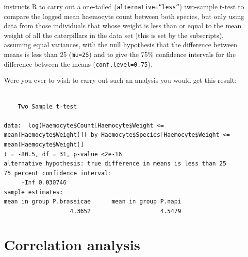 \documentclass[
]{book}
\newenvironment{Shaded}{\begin{snugshade}}{\end{snugshade}}
\newcommand{\DataTypeTok}[1]{\textcolor[rgb]{0.13,0.29,0.53}{#1}}
\newcommand{\DecValTok}[1]{\textcolor[rgb]{0.00,0.00,0.81}{#1}}
\newcommand{\FloatTok}[1]{\textcolor[rgb]{0.00,0.00,0.81}{#1}}
\newcommand{\KeywordTok}[1]{\textcolor[rgb]{0.13,0.29,0.53}{\textbf{#1}}}
\newcommand{\NormalTok}[1]{#1}
\newcommand{\OperatorTok}[1]{\textcolor[rgb]{0.81,0.36,0.00}{\textbf{#1}}}
\newcommand{\StringTok}[1]{\textcolor[rgb]{0.31,0.60,0.02}{#1}}
\begin{document}
\begin{Shaded}
\end{Shaded}

instructs R to carry out a one-tailed (\texttt{alternative=”less”}) two-sample t-test to compare the logged mean haemocyte count between both species, but only using data from those individuals that whose weight is less than or equal to the mean weight of all the caterpillars in the data set (this is set by the subscripts), assuming equal variances, with the null hypothesis that the difference between means is less than 25 (\texttt{mu=25}) and to give the 75\% confidence intervals for the difference between the means (\texttt{conf.level=0.75}).

Were you ever to wish to carry out such an analysis you would get this result:

\begin{verbatim}

    Two Sample t-test

data:  log(Haemocyte$Count[Haemocyte$Weight <= mean(Haemocyte$Weight)]) by Haemocyte$Species[Haemocyte$Weight <= mean(Haemocyte$Weight)]
t = -80.5, df = 31, p-value <2e-16
alternative hypothesis: true difference in means is less than 25
75 percent confidence interval:
     -Inf 0.030746
sample estimates:
mean in group P.brassicae      mean in group P.napi 
                   4.3652                    4.5479 
\end{verbatim}

\hypertarget{correlation-analysis}{%
\chapter{Correlation analysis}\label{correlation-analysis}}
\end{document}
